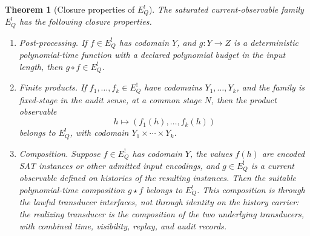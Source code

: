 \documentclass[11pt]{article}
\newcommand{\EQbang}{E^{!}_{Q}}
\newtheorem{theorem}{Theorem}[section]
\theoremstyle{definition}
\begin{document}
\begin{theorem}[Closure properties of \(\EQbang\)]
\label{thm:pvnp:e-q-closure-properties}
The saturated current-observable family \(\EQbang\) has the following
closure properties.
\begin{enumerate}
  \item \emph{Post-processing.}  If \(f\in\EQbang\) has codomain
  \(Y\), and \(g:Y\to Z\) is a deterministic polynomial-time function
  with a declared polynomial budget in the input length, then
  \(g\circ f\in\EQbang\).

  \item \emph{Finite products.}  If
  \(f_{1},\ldots,f_{k}\in\EQbang\) have codomains
  \(Y_{1},\ldots,Y_{k}\), and the family is fixed-stage in the audit
  sense, at a common stage \(N\), then the product observable
  \[
    h\longmapsto (f_{1}(h),\ldots,f_{k}(h))
  \]
  belongs to \(\EQbang\), with codomain
  \(Y_{1}\times\cdots\times Y_{k}\).

  \item \emph{Composition.}  Suppose \(f\in\EQbang\) has codomain
  \(Y\), the values \(f(h)\) are encoded SAT instances or other
  admitted input encodings, and \(g\in\EQbang\) is a current
  observable defined on histories of the resulting instances.  Then
  the suitable polynomial-time composition \(g\star f\) belongs to
  \(\EQbang\).  This composition is through the lawful transducer
  interfaces, not through identity on the history carrier: the
  realizing transducer is the composition of the two underlying
  transducers, with combined time, visibility, replay, and audit
  records.
\end{enumerate}
\end{theorem}
\end{document}
